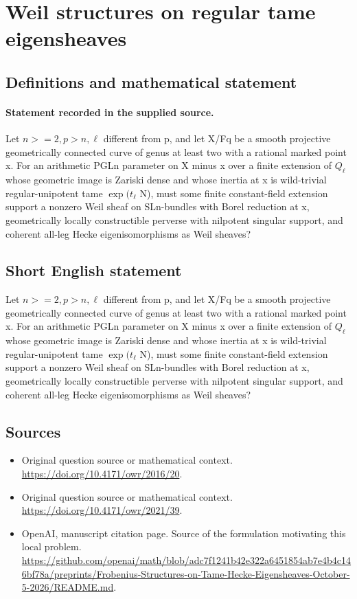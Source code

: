 \documentclass[11pt]{article}
\begin{document}
\section*{Weil structures on regular tame eigensheaves}\label{30007290}
\subsection{Definitions and mathematical statement}
\paragraph{Statement recorded in the supplied source.}
Let $n>=2,p>n,\ell $ different from p, and let X/Fq be a smooth projective geometrically connected curve of genus at least two with a rational marked point x. For an arithmetic PGLn parameter on X minus x over a finite extension of $Q_\ell $ whose geometric image is Zariski dense and whose inertia at x is wild-trivial regular-unipotent tame $\exp (t_\ell $ N), must some finite constant-field extension support a nonzero Weil sheaf on SLn-bundles with Borel reduction at x, geometrically locally constructible perverse with nilpotent singular support, and coherent all-leg Hecke eigenisomorphisms as Weil sheaves?
\subsection{Short English statement}
Let $n>=2,p>n,\ell $ different from p, and let X/Fq be a smooth projective geometrically connected curve of genus at least two with a rational marked point x. For an arithmetic PGLn parameter on X minus x over a finite extension of $Q_\ell $ whose geometric image is Zariski dense and whose inertia at x is wild-trivial regular-unipotent tame $\exp (t_\ell $ N), must some finite constant-field extension support a nonzero Weil sheaf on SLn-bundles with Borel reduction at x, geometrically locally constructible perverse with nilpotent singular support, and coherent all-leg Hecke eigenisomorphisms as Weil sheaves?
\subsection{Sources}
\begin{itemize}
\item[S1] Original question source or mathematical context.
\url{https://doi.org/10.4171/owr/2016/20}.
\item[S2] Original question source or mathematical context.
\url{https://doi.org/10.4171/owr/2021/39}.
\item[S3] OpenAI, manuscript citation page. Source of the formulation motivating this local problem.
\url{https://github.com/openai/math/blob/adc7f1241b42e322a6451854ab7e4b4c146bf78a/preprints/Frobenius-Structures-on-Tame-Hecke-Eigensheaves-October-5-2026/README.md}.
\end{itemize}
\end{document}
